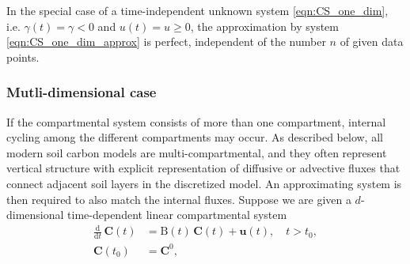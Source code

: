 \documentclass[11pt,a4paper]{article}
\renewcommand{\vec}[1]{\mathbf{#1}}
\newcommand{\tens}[1]{\mathrm{#1}}
\newcommand{\deriv}[1]{\frac{\mathrm{d}}{\mathrm{d}#1}}
\begin{document}
        In the special case of a time-independent unknown system \eqref{eqn:CS_one_dim}, i.e. $\gamma(t)=\gamma<0$ and $u(t)=u\geq0$, the approximation by system \eqref{eqn:CS_one_dim_approx} is perfect, independent of the number $n$ of given data points.\\
        
    \subsubsection*{Mutli-dimensional case}
        If the compartmental system consists of more than one compartment, internal cycling among the different compartments may occur. As described below, all modern soil carbon models are multi-compartmental, and they often represent vertical structure with explicit representation of diffusive or advective fluxes that connect adjacent soil layers in the discretized model.
        An approximating system is then required to also match the internal fluxes.
        Suppose we are given a $d$-dimensional time-dependent linear compartmental system
        \begin{equation}\label{eqn:CS_multi_dim}
            \begin{aligned}
                \deriv{t}\,\vec{C}(t) &= \tens{B}(t)\,\vec{C}(t) + \vec{u}(t),\quad t>t_0,\\
                \vec{C}(t_0) &= \vec{C}^0,
            \end{aligned}
        \end{equation}
\end{document}

